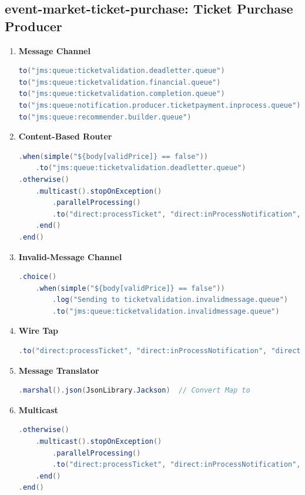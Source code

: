 \documentclass{article}
\begin{document}
\subsection{event-market-ticket-purchase: Ticket Purchase Producer}
\begin{enumerate}
    \item \textbf{Message Channel}
\begin{lstlisting}[language=Java, caption={Message Channel for Ticket Purchase}]
to("jms:queue:ticketvalidation.deadletter.queue")
to("jms:queue:ticketvalidation.financial.queue")
to("jms:queue:ticketvalidation.completion.queue")
to("jms:queue:notification.producer.ticketpayment.inprocess.queue")
to("jms:queue:recommender.builder.queue")
\end{lstlisting}
    \item \textbf{Content-Based Router}
\begin{lstlisting}[language=Java, caption={Content-Based Router for Ticket Purchase}]
.when(simple("${body[validPrice]} == false"))
    .to("jms:queue:ticketvalidation.deadletter.queue")
.otherwise()
    .multicast().stopOnException()
        .parallelProcessing()
        .to("direct:processTicket", "direct:inProcessNotification", "direct:inProcessRecommender")
    .end()
.end()
\end{lstlisting}
    \item \textbf{Invalid-Message Channel}
\begin{lstlisting}[language=Java, caption={Invalid-Message Channel for Ticket Purchase}]
.choice()
    .when(simple("${body[validPrice]} == false"))
        .log("Sending to ticketvalidation.invalidmessage.queue")
        .to("jms:queue:ticketvalidation.invalidmessage.queue")
\end{lstlisting}
    \item \textbf{Wire Tap}
\begin{lstlisting}[language=Java, caption={Wire Tap for Ticket Purchase}]
.to("direct:processTicket", "direct:inProcessNotification", "direct:inProcessRecommender")
\end{lstlisting}
    \item \textbf{Message Translator}
\begin{lstlisting}[language=Java, caption={Message Translator for Ticket Purchase}]
.marshal().json(JsonLibrary.Jackson)  // Convert Map to 
\end{lstlisting}
    \item \textbf{Multicast}
\begin{lstlisting}[language=Java, caption={Multicast for Ticket Purchase}]
.otherwise()
    .multicast().stopOnException()
        .parallelProcessing()
        .to("direct:processTicket", "direct:inProcessNotification", "direct:inProcessRecommender")
    .end()
.end()
\end{lstlisting}
\end{enumerate}
\end{document}
